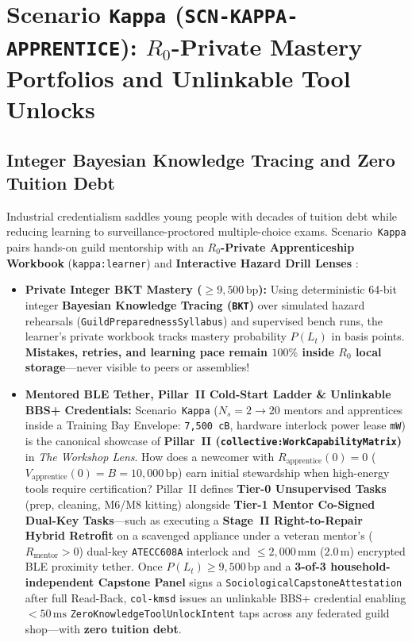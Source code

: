 \section{Scenario \texttt{Kappa} (\texttt{SCN-KAPPA-APPRENTICE}): $R_0$-Private Mastery Portfolios and Unlinkable Tool Unlocks}
\label{sec:wave-c-kappa}

\subsection{Integer Bayesian Knowledge Tracing and Zero Tuition Debt}

Industrial credentialism saddles young people with decades of tuition debt while reducing learning to surveillance-proctored multiple-choice exams. Scenario~\texttt{Kappa} pairs hands-on guild mentorship with an \textbf{$R_0$-Private Apprenticeship Workbook} (\texttt{kappa:learner}) and \textbf{Interactive Hazard Drill Lenses} \parencite{corbett1995bkt,girard2013}:
\begin{itemize}
    \item \textbf{Private Integer BKT Mastery ($\ge 9{,}500\,\mathrm{bp}$):} Using deterministic 64-bit integer \textbf{Bayesian Knowledge Tracing (\texttt{BKT})} \parencite{corbett1995bkt} over simulated hazard rehearsals (\texttt{GuildPreparednessSyllabus}) and supervised bench runs, the learner's private workbook tracks mastery probability $P(L_t)$ in basis points. \textbf{Mistakes, retries, and learning pace remain $100\%$ inside $R_0$ local storage}---never visible to peers or assemblies!
    \item \textbf{Mentored BLE Tether, Pillar~II Cold-Start Ladder \& Unlinkable BBS+ Credentials:} Scenario~\texttt{Kappa} ($N_s = 2 \to 20$ mentors and apprentices inside a Training Bay Envelope: \texttt{7,500 cB}, hardware interlock power lease \texttt{mW}) is the canonical showcase of \textbf{Pillar~II (\texttt{collective:WorkCapabilityMatrix})} in \textit{The Workshop Lens}. How does a newcomer with $R_{\mathrm{apprentice}}(0) = 0$ ($V_{\mathrm{apprentice}}(0) = B = 10{,}000\,\mathrm{bp}$) earn initial stewardship when high-energy tools require certification? Pillar~II defines \textbf{Tier-0 Unsupervised Tasks} (prep, cleaning, M6/M8 kitting) alongside \textbf{Tier-1 Mentor Co-Signed Dual-Key Tasks}---such as executing a \textbf{Stage~II Right-to-Repair Hybrid Retrofit} on a scavenged appliance under a veteran mentor's ($R_{\mathrm{mentor}} > 0$) dual-key \texttt{ATECC608A} interlock and $\le 2{,}000\,\mathrm{mm}$ ($2.0\,\mathrm{m}$) encrypted BLE proximity tether. Once $P(L_t) \ge 9{,}500\,\mathrm{bp}$ and a \textbf{3-of-3 household-independent Capstone Panel} signs a \texttt{SociologicalCapstoneAttestation} after full Read-Back, \texttt{col-kmsd} issues an unlinkable BBS+ credential enabling $< 50\,\mathrm{ms}$ \texttt{ZeroKnowledgeToolUnlockIntent} taps across any federated guild shop---with \textbf{zero tuition debt}.
\end{itemize}

